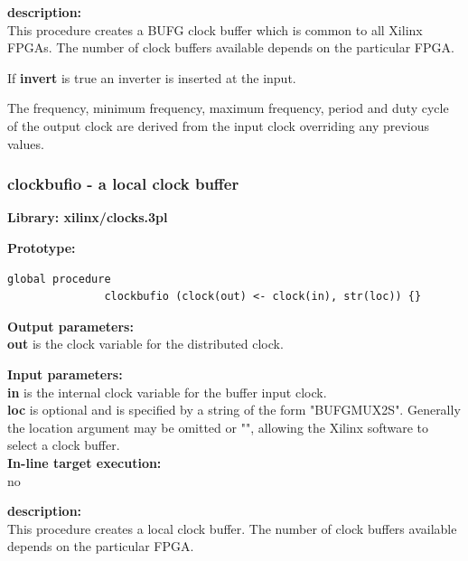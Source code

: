             {\bf description:} \\
            This procedure creates a BUFG clock buffer which is common to all
            Xilinx FPGAs. The number of clock buffers
            available depends on the particular FPGA.
            
            If {\bf invert} is true an inverter is inserted at the input.
            
            The frequency, minimum frequency, maximum frequency, period and duty
            cycle of the output clock are derived from the input clock overriding
            any previous values.



        \subsubsection{clockbufio - a local clock buffer}\label{sec:lpclockbufio}
            
            {\bf Library: xilinx/clocks.3pl}

            {\bf Prototype:} \\
            \vsp
            \begin{lstlisting}[gobble=12, language=threepl]
               global procedure
               clockbufio (clock(out) <- clock(in), str(loc)) {}
            \end{lstlisting}

            {\bf Output parameters:} \\
            {\bf out} is the clock variable for the distributed clock.

            {\bf Input parameters:} \\            
            {\bf in} is the internal clock variable for the buffer input
            clock.\\
            {\bf loc} is optional and is specified by a string of the form
            "BUFGMUX2S". Generally the location argument may be omitted or "",
            allowing the Xilinx software to select a clock buffer. \\
        
            {\bf In-line target execution:} \\
            no

            {\bf description:} \\
            This procedure creates a local clock buffer. The number of clock
            buffers available depends on the particular FPGA.
            
